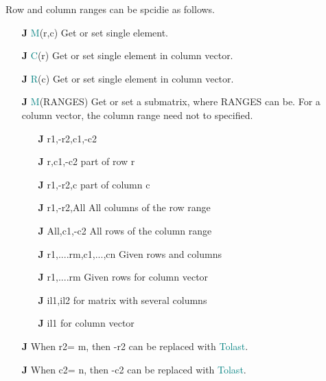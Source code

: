 Row and column ranges can be spcidie as follows.
\begin{itemize}
\item[\textbf{J}\.] \textcolor{teal}{M}(r,c) \tabto{5cm} Get or set single element.
\item[\textbf{J}\.] \textcolor{teal}{C}(r)  \tabto{5cm} Get or set single element in column vector.
\item[\textbf{J}\.] \textcolor{teal}{R}(c) \tabto{5cm} Get or set single element in column vector.
\item[\textbf{J}\.] \textcolor{teal}{M}(RANGES) \tabto{5cm} Get or set a submatrix, where RANGES
can be. For a column vector, the column range need not to specified.
\begin{itemize}
\item[\textbf{J}\.] r1,-r2,c1,-c2
\item[\textbf{J}\.] r,c1,-c2  \tabto{5cm} part of row r
\item[\textbf{J}\.] r1,-r2,c	\tabto{5cm} part of column c
\item[\textbf{J}\.] r1,-r2,All  \tabto{5cm} All columns of the row range
\item[\textbf{J}\.] All,c1,-c2  \tabto{5cm} All rows of the column range
\item[\textbf{J}\.] {r1,....rm},{c1,...,cn}  \tabto{5cm} Given rows and columns
\item[\textbf{J}\.] {r1,....rm}  \tabto{5cm} Given rows for column vector
\item[\textbf{J}\.] il1,il2   \tabto{5cm} for matrix with several columns
\item[\textbf{J}\.] il1   \tabto{5cm} for column vector
\end{itemize}
\item[\textbf{J}\.] When r2= m, then -r2 can be replaced with \textcolor{teal}{Tolast}.
\item[\textbf{J}\.] When c2= n, then -c2 can be replaced with \textcolor{teal}{Tolast}.
\end{itemize}

